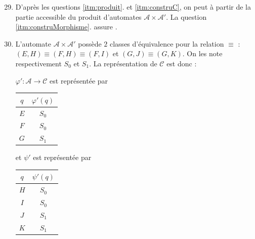 \documentclass{article}
\begin{document}
\begin{enumerate}
    \setcounter{enumi}{28}
    
    \item \label{itm:construC2} D'après les questions \ref{itm:produit}. et \ref{itm:construC}, on peut  à partir de la partie accessible du produit d'automates $\mathcal{A} \times \mathcal{A'}$. \newline
    La question \ref{itm:construMorphisme}. assure .

    \item L'automate $\mathcal{A} \times \mathcal{A'}$ possède $2$ classes d'équivalence pour la relation $\equiv$ : $(E, H) \equiv (F, H) \equiv (F, I)$ et $(G, J) \equiv (G, K)$. On les note respectivement $S_0$ et $S_1$. \newline
    La représentation de $\mathcal{C}$ est donc : \newline
    \begin{minipage}[t]{\linewidth}
        \centering
        \label{fig:fig2}
        \end{minipage}
    $\varphi' : \mathcal{A} \to \mathcal{C}$ est représentée par \begin{tabular}{|c|c|}
        \hline
        $q$ & $\varphi'(q)$ \\
        \hline
        $E$ & $S_0$ \\
        \hline
        $F$ & $S_0$ \\
        \hline
        $G$ & $S_1$ \\
        \hline
    \end{tabular}
    et $\psi'$ est représentée par \begin{tabular}{|c|c|}
        \hline
        $q$ & $\psi'(q)$ \\
        \hline
        $H$ & $S_0$ \\
        \hline
        $I$ & $S_0$ \\
        \hline
        $J$ & $S_1$ \\
        \hline
        $K$ & $S_1$ \\
        \hline
    \end{tabular}


\end{enumerate}
\end{document}
